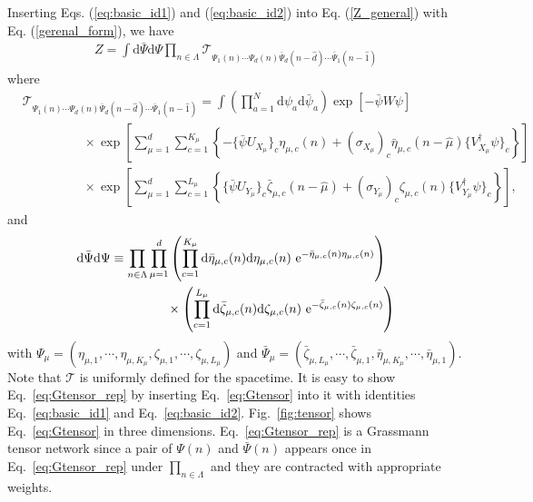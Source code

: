 \documentclass[a4paper,11pt]{article}
\newcommand{\diff}{\mathrm{d}}
\begin{document}
Inserting Eqs. (\ref{eq:basic_id1}) and (\ref{eq:basic_id2}) into Eq. (\ref{Z_general}) with Eq. (\ref{gerenal_form}),
we have
\begin{eqnarray}
\label{eq:Gtensor_rep}
	Z= \int \diff \bar \Psi \diff \Psi 
	\prod_{n \in \Lambda} 
	\mathcal{T}_{\Psi_1(n) \cdots \Psi_d(n)  \bar \Psi_d(n-\hat d) \cdots \bar\Psi_1 (n-\hat 1)}
\end{eqnarray}
where 
\begin{align}
\label{eq:Gtensor}
	&\mathcal{T}_{\Psi_1(n) \cdots \Psi_d(n)  \bar \Psi_d(n-\hat d) \cdots \bar\Psi_1 (n-\hat 1)} 
	=
	\int \left(\prod_{a=1}^{N}\diff\psi_{a}\diff\bar{\psi}_{a} \right)
	\exp\left[-\bar{\psi} W \psi \right]\nonumber\\
	&\hspace{2cm} \times\exp\left[\sum_{\mu=1}^{d}
	\sum_{c=1}^{K_{\mu}}\left\{-\{\bar{\psi} U_{X_\mu}\}_{c}  \eta_{\mu,c}(n) 
	+ (\sigma_{X_\mu})_{c}  \bar{\eta}_{\mu,c}(n-\hat{\mu}) \{V_{X_{\mu}}^{\dag}\psi\}_{c}\right\}\right]\nonumber\\
	&\hspace{2cm} \times\exp\left[
	\sum_{\mu=1}^{d}\sum_{c=1}^{L_{\mu}}\left\{\{\bar{\psi}U_{Y_\mu}\}_{c}  \bar{\zeta}_{\mu,c}(n-\hat{\mu}) 
	+ (\sigma_{Y_\mu})_{c}  \zeta_{\mu,c}(n) \{V_{Y_{\mu}}^{\dag}\psi\}_{c}\right\}\right],
\end{align}
and
\begin{align}
& \diff \bar \Psi \diff \Psi  \equiv 
\prod_{n \in \Lambda} 
\prod_{\mu=1}^d 
\left( \prod_{c=1}^{K_\mu}  
\diff\bar{\eta}_{\mu,c}(n) \diff\eta_{\mu,c}(n)~ {\rm e}^{-\bar{\eta}_{\mu,c}(n) \eta_{\mu,c}(n)} \right) \nonumber \\
%
&\hspace{2.5cm} 
\times \left(
\prod_{c=1}^{L_\mu}  \diff\bar{\zeta}_{\mu,c}(n) \diff\zeta_{\mu,c}(n)~{\rm e}^{-\bar{\zeta}_{\mu,c}(n) \zeta_{\mu,c}(n)} \right)
%
\end{align}
with $\Psi_\mu=(\eta_{\mu,1},\cdots,\eta_{\mu,K_{\mu}},\zeta_{\mu,1},\cdots,\zeta_{\mu,L_{\mu}})$ and $\bar\Psi_\mu=(\bar\zeta_{\mu,L_{\mu}},\cdots,\bar\zeta_{\mu,1},\bar\eta_{\mu,K_\mu},\cdots,\bar\eta_{\mu,1})$. Note that $\mathcal{T}$ is uniformly defined for the spacetime. 
It is easy to show Eq.~\eqref{eq:Gtensor_rep} by inserting Eq.~\eqref{eq:Gtensor} into it with 
identities Eq.~\eqref{eq:basic_id1} and Eq.~\eqref{eq:basic_id2}. Fig.~\ref{fig:tensor} shows Eq.~\eqref{eq:Gtensor} in three dimensions. Eq.~\eqref{eq:Gtensor_rep} is a Grassmann tensor network since a pair of $\Psi(n)$ and $\bar \Psi(n)$ appears once in Eq.~\eqref{eq:Gtensor_rep} under $\prod_{n \in \Lambda}$ and they are contracted with appropriate weights.
\end{document}
